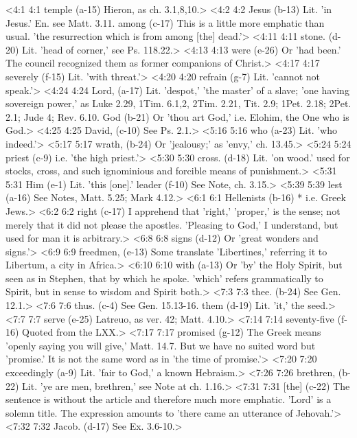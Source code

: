 <4:1 4:1  temple (a-15)  Hieron, as ch. 3.1,8,10.>
<4:2 4:2  Jesus (b-13)  Lit. 'in Jesus.' En. see Matt. 3.11.
  among (c-17)  This is a little more emphatic than usual. 'the resurrection  which is from among [the] dead.'>
<4:11 4:11  stone. (d-20)  Lit. 'head of corner,' see Ps. 118.22.>
<4:13 4:13  were (e-26)  Or 'had been.' The council recognized them as former  companions of Christ.>
<4:17 4:17  severely (f-15)  Lit. 'with threat.'>
<4:20 4:20  refrain (g-7)  Lit. 'cannot not speak.'>
<4:24 4:24  Lord, (a-17)  Lit. 'despot,' 'the master' of a slave; 'one having sovereign  power,' as Luke 2.29, 1Tim. 6.1,2, 2Tim. 2.21, Tit. 2.9; 1Pet.  2.18; 2Pet. 2.1; Jude 4; Rev. 6.10.
  God (b-21)  Or 'thou art God,' i.e. Elohim, the One who is God.>
<4:25 4:25  David, (c-10)  See Ps. 2.1.>
<5:16 5:16  who (a-23)  Lit. 'who indeed.'>
<5:17 5:17  wrath, (b-24)  Or 'jealousy;' as 'envy,' ch. 13.45.>
<5:24 5:24  priest (c-9)  i.e. 'the high priest.'>
<5:30 5:30  cross. (d-18)  Lit. 'on wood.' used for stocks, cross, and such ignominious  and forcible means of punishment.>
<5:31 5:31  Him  (e-1)  Lit. 'this [one].'
  leader (f-10)  See Note, ch. 3.15.>
<5:39 5:39  lest (a-16)  See Notes, Matt. 5.25; Mark 4.12.>
<6:1 6:1  Hellenists (b-16)  * i.e. Greek Jews.>
<6:2 6:2  right (c-17)  I apprehend that 'right,' 'proper,' is the sense; not merely  that it did not please the apostles. 'Pleasing to God,' I  understand, but used for man it is arbitrary.>
<6:8 6:8  signs (d-12)  Or 'great wonders and signs.'>
<6:9 6:9  freedmen, (e-13)  Some translate 'Libertines,' referring it to Libertum, a city  in Africa.>
<6:10 6:10  with (a-13)  Or 'by' the Holy Spirit, but seen as in Stephen, that by  which he spoke. 'which' refers grammatically to Spirit, but in  sense to wisdom and Spirit both.>
<7:3 7:3  thee. (b-24)  See Gen. 12.1.>
<7:6 7:6  thus. (c-4)  See Gen. 15.13-16.
  them (d-19)  Lit. 'it,' the seed.>
<7:7 7:7  serve (e-25)  Latreuo, as ver. 42; Matt. 4.10.>
<7:14 7:14  seventy-five (f-16)  Quoted from the LXX.>
<7:17 7:17  promised (g-12)  The Greek means 'openly saying you will give,' Matt. 14.7.  But we have no suited word but 'promise.' It is not the same  word as in 'the time of promise.'>
<7:20 7:20  exceedingly (a-9)  Lit. 'fair to God,' a known Hebraism.>
<7:26 7:26  brethren, (b-22)  Lit. 'ye are men, brethren,' see Note at ch. 1.16.>
<7:31 7:31  [the] (c-22)  The sentence is without the article and therefore much more  emphatic. 'Lord' is a solemn title. The expression amounts to  'there came an utterance of Jehovah.'>
<7:32 7:32  Jacob. (d-17)  See Ex. 3.6-10.>
